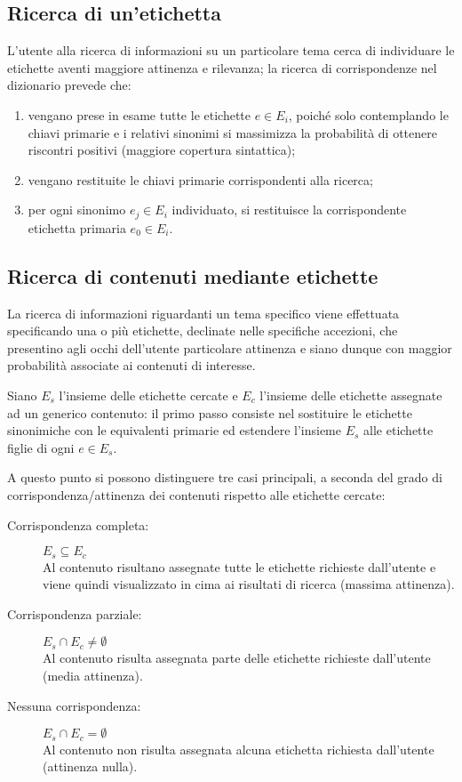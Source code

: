 \documentclass[10pt,a4paper,headinclude,footinclude,hidelinks]{scrreprt} %
\begin{document}
	\subsection{Ricerca di un'etichetta}
	L'utente alla ricerca di informazioni su un particolare tema cerca di individuare le etichette aventi maggiore attinenza e rilevanza; la ricerca di corrispondenze nel dizionario prevede che:
	\begin{enumerate}
	\item vengano prese in esame tutte le etichette $e \in E_i$, poiché solo contemplando le chiavi primarie e i relativi sinonimi si massimizza la probabilità di ottenere riscontri positivi (maggiore copertura sintattica);
	\item vengano restituite le chiavi primarie corrispondenti alla ricerca;
	\item per ogni sinonimo $e_j \in E_i$ individuato, si restituisce la corrispondente etichetta primaria $e_0 \in E_i$.
	\end{enumerate}

	\subsection{Ricerca di contenuti mediante etichette}
	La ricerca di informazioni riguardanti un tema specifico viene effettuata specificando una o più etichette, declinate nelle specifiche accezioni, che presentino agli occhi dell'utente particolare attinenza e siano dunque con maggior probabilità associate ai contenuti di interesse.

	Siano $E_s$ l'insieme delle etichette cercate e $E_c$ l'insieme delle etichette assegnate ad un generico contenuto: il primo passo consiste nel sostituire le etichette sinonimiche con le equivalenti primarie ed estendere l'insieme $E_s$ alle etichette figlie di ogni $e \in E_s$.

	A questo punto si possono distinguere tre casi principali, a seconda del grado di corrispondenza/attinenza dei contenuti rispetto alle etichette cercate:
	\begin{description}
	\item[Corrispondenza completa:] $E_s \subseteq E_c$ \hfill \\
	Al contenuto risultano assegnate tutte le etichette richieste dall'utente e viene quindi visualizzato in cima ai risultati di ricerca (massima attinenza).
 	\item[Corrispondenza parziale:] $E_s \cap E_c \neq \emptyset$ \hfill \\
	Al contenuto risulta assegnata parte delle etichette richieste dall'utente (media attinenza).
	\item[Nessuna corrispondenza:] $E_s \cap E_c = \emptyset$\hfill \\
	Al contenuto non risulta assegnata alcuna etichetta richiesta dall'utente (attinenza nulla).
	\end{description}
\end{document}
